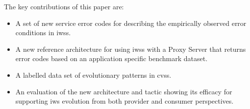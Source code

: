 














The key contributions of this paper are: 

\begin{itemize}
    \item A set of new service error codes for describing the empirically observed error conditions in \glspl{iws}.
    \item A new reference architecture for using \glspl{iws} with a Proxy Server that returns error codes based on an application specific benchmark dataset.
    \item A labelled data set of evolutionary patterns in \glspl{cvs}.
    \item An evaluation of the new architecture and tactic showing its efficacy for supporting \gls{iws} evolution from both provider and consumer perspectives.
\end{itemize}





